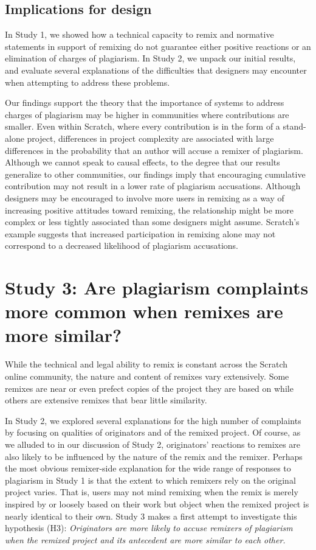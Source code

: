 \subsection{Implications for design}

In Study 1, we showed how a technical capacity to remix and normative
statements in support of remixing do not guarantee either positive
reactions or an elimination of charges of plagiarism. In Study 2, we
unpack our initial results, and evaluate several explanations of the
difficulties that designers may encounter when attempting to address
these problems.

Our findings support the theory that the importance of systems to
address charges of plagiarism may be higher in communities where
contributions are smaller. Even within Scratch, where every contribution
is in the form of a stand-alone project, differences in project
complexity are associated with large differences in the probability that
an author will accuse a remixer of plagiarism. Although we cannot speak
to causal effects, to the degree that our results generalize to other
communities, our findings imply that encouraging cumulative contribution
may not result in a lower rate of plagiarism accusations.  Although
designers may be encouraged to involve more users in remixing as a way
of increasing positive attitudes toward remixing, the relationship might
be more complex or less tightly associated than some designers might
assume.  Scratch's example suggests that increased participation in
remixing alone may not correspond to a decreased likelihood of plagiarism
accusations.

\section{Study 3: Are plagiarism complaints more common when remixes are
more similar?}

While the technical and legal ability to remix is constant across
the Scratch online community, the nature and content of remixes vary
extensively. Some remixes are near or even prefect copies of the project
they are based on while others are extensive remixes that bear little
similarity.

In Study 2, we explored several explanations for the high number of
complaints by focusing on qualities of originators and of the remixed
project. Of course, as we alluded to in our discussion of Study 2,
originators' reactions to remixes are also likely to be influenced by
the nature of the remix and the remixer. Perhaps the most obvious
remixer-side explanation for the wide range of responses to plagiarism
in Study 1 is that the extent to which remixers rely on the original
project varies.  That is, users may not mind remixing when the remix is
merely inspired by or loosely based on their work but object when
the remixed project is nearly identical to their own.  Study 3 makes a
first attempt to investigate this hypothesis (H3): {\em Originators are
more likely to accuse remixers of plagiarism when the remixed project
and its antecedent are more similar to each other.}

